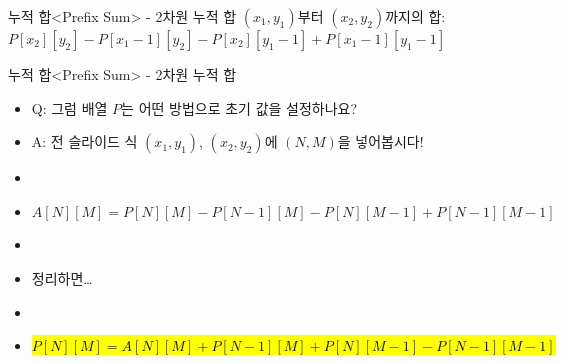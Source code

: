 \begin{frame}{누적 합}{<Prefix Sum> - 2차원 누적 합}
  $(x_1, y_1)$부터 $(x_2, y_2)$까지의 합:
  $P[x_2][y_2] - P[x_1{-}1][y_2] - P[x_2][y_1{-}1] + P[x_1{-}1][y_1{-}1]$
  \vspace{8mm}
  \begin{center}
    \hspace{2mm}\raisebox{7mm}{$=$}\hspace{2mm}
    \hspace{2mm}\raisebox{7mm}{$-$}\hspace{2mm}
    \hspace{2mm}\raisebox{7mm}{$-$}\hspace{2mm}
    \hspace{2mm}\raisebox{7mm}{$+$}\hspace{2mm}
  \end{center}
\end{frame}

\begin{frame}{누적 합}{<Prefix Sum> - 2차원 누적 합}
  \begin{itemize}
    \item Q: 그럼 배열 $P$는 어떤 방법으로 초기 값을 설정하나요?
    \item A: 전 슬라이드 식 $(x_1, y_1)$, $(x_2, y_2)$에 $(N, M)$을 넣어봅시다!
    \item[] \vspace{2mm}
    \item[] $A[N][M] = P[N][M] - P[N{-}1][M] - P[N][M{-}1] + P[N{-}1][M{-}1]$
    \item[] \vspace{2mm}
    \item 정리하면…
    \item[] \vspace{2mm}
    \item[] \hl{$P[N][M] = A[N][M] + P[N{-}1][M] + P[N][M{-}1] - P[N{-}1][M{-}1]$}
  \end{itemize}
\end{frame}

